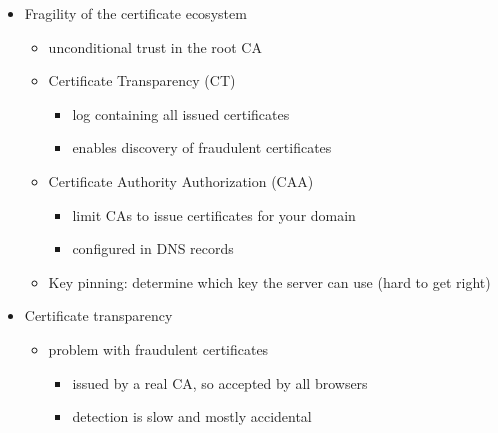 \documentclass[12pt,titlepage,a4paper]{report}
\begin{document}
\begin{itemize}
		\item Fragility of the certificate ecosystem
		\begin{itemize}
			\item unconditional trust in the root CA
			\item Certificate Transparency (CT)
			\begin{itemize}
				\item log containing all issued certificates
				\item enables discovery of fraudulent certificates
			\end{itemize}
			\item  Certificate Authority Authorization (CAA)
			\begin{itemize}
				\item limit CAs to issue certificates for your domain
				\item configured in DNS records
			\end{itemize}
			\item Key pinning: determine which key the server can use (hard to get right)
		\end{itemize}
	
		\item Certificate transparency
		\begin{itemize}
			\item problem with fraudulent certificates
			\begin{itemize}
				\item issued by a real CA, so accepted by all browsers
				\item detection is slow and mostly accidental
			\end{itemize}
			

\end{itemize}
\end{itemize}
\end{document}
